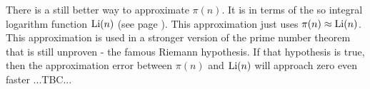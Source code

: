 \medskip
There is a still better way to approximate $\pi(n)$. It is in terms of the so integral logarithm function $\operatorname{Li}(n)$ (see page \pageref{Eq:LogarithmicIntegral}). This approximation just uses $\pi(n) \approx \operatorname{Li}(n)$. This approximation is used in a stronger version of the prime number theorem that is still unproven - the famous Riemann hypothesis. If that hypothesis is true, then the approximation error between $\pi(n)$ and $\operatorname{Li}(n)$ will approach zero even faster ...TBC...









\begin{comment}


Mathe-News: Die größte bekannte Primzahl
https://www.youtube.com/watch?v=SPYf1M_DqHU
-Primes of the form  a^b - 1  can only be of the form  2^p - 1  with p being itself prime. That is,
 the only basis that works is 2 and the exponent has to be a prime.
-Fermat's little theorem: a^p = p  (mod p)   for p prime an a integer. If a is no multiple of p then
 a^(p-1) = 1  (mod p)
-Lucas-Lehmer test


Idea for proof by induction for number-theorectical theorems:
-Base case: Show that the theorem holds for prime numbers 
-Induction step: Show that if the theorem holds for two numbers a and b, it follows that it also
 holds for their product a*b. 
-That shows that it holds for all natural numbers. Maybe call it induction over factorizations or
 shorter: factor induction.


\end{comment}